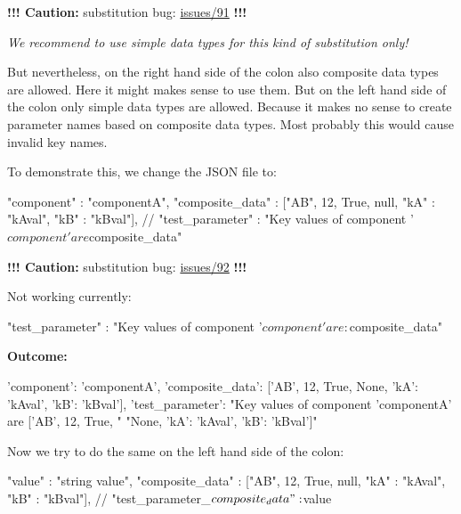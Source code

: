 \textbf{!!! Caution:} substitution bug:
\href{https://github.com/test-fullautomation/python-jsonpreprocessor/issues/91}{issues/91} \textbf{!!!}

\textit{We recommend to use simple data types for this kind of substitution only!}

But nevertheless, on the right hand side of the colon also composite data types are allowed. Here it might makes sense to use them.
But on the left hand side of the colon only simple data types are allowed. Because it makes no sense to create
parameter names based on composite data types. Most probably this would cause invalid key names.

To demonstrate this, we change the JSON file to:

\begin{pythoncode}
{
   "component"      : "componentA",
   "composite_data" : ["AB", 12, True, null, {"kA" : "kAval", "kB" : "kBval"}],
   //
   "test_parameter" : "Key values of component '${component}' are ${composite_data}"
}
\end{pythoncode}

\textbf{!!! Caution:} substitution bug:
\href{https://github.com/test-fullautomation/python-jsonpreprocessor/issues/92}{issues/92} \textbf{!!!}

Not working currently:
\begin{pythoncode}
   "test_parameter" : "Key values of component '${component}' are: ${composite_data}"
\end{pythoncode}

\vspace{2ex}

\textbf{Outcome:}

\begin{pythonlog}
{'component': 'componentA',
 'composite_data': ['AB', 12, True, None, {'kA': 'kAval', 'kB': 'kBval'}],
 'test_parameter': "Key values of component 'componentA' are ['AB', 12, True, "
                   "None, {'kA': 'kAval', 'kB': 'kBval'}]"}
\end{pythonlog}

\newpage

Now we try to do the same on the left hand side of the colon:

\begin{pythoncode}
{
   "value"          : "string value",
   "composite_data" : ["AB", 12, True, null, {"kA" : "kAval", "kB" : "kBval"}],
   //
   "test_parameter_${composite_data}" : ${value}
}
\end{pythoncode}

